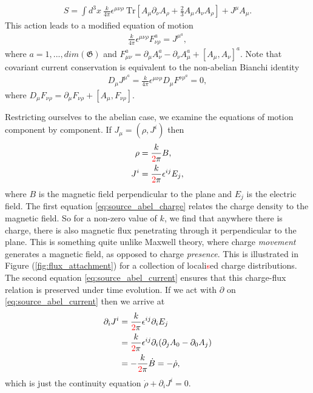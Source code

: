     \begin{align}
        S = \int d^3x \ \frac{k}{4 \pi} \epsilon^{\mu \nu \rho} \ \mathrm{Tr} \left[A_{\mu} \partial_{\nu} A_{\rho}+ \frac{2}{3} A_{\mu} A_{\nu} A_{\rho} \right] + J^{\mu} A_{\mu}.
    \end{align}
    This action leads to a modified equation of motion
    \begin{align}
        \frac{k}{4 \pi} \epsilon^{\mu \nu \rho} F^a_{\nu \rho} = J^{\mu}^a,
    \end{align}
    where $a=1,...,dim(\mathfrak{G})$ and $F_{\mu \nu}^a = \partial_{\mu} A_{\nu}^a - \partial_{\nu} A_{\mu}^a + [A_{\mu}, A_{\nu}]^a$. Note that covariant current conservation is equivalent to the non-abelian Bianchi identity
    \begin{align}
        D_{\mu} J^{\mu}^a = \frac{k}{4 \pi} \epsilon^{\mu \nu \rho} D_{\mu} F^{\nu \rho}^a = 0,
    \end{align}
    where $D_{\mu} F_{\nu \rho} = \partial_{\mu} F_{\nu \rho} + [A_{\mu}, F_{\nu \rho}]$.

    Restricting ourselves to the abelian case, we examine the equations of motion component by component. If $J_{\mu} = (\rho, J^i)$ then
    \begin{align}
        \rho  &= \frac{k}{\textcolor{red}{2} \pi} B \label{eq:source_abel_charge} ,\\
        J^i &= \frac{k}{\textcolor{red}{2} \pi} \epsilon^{i j } E_j \label{eq:source_abel_current},
    \end{align}
    where $B$ is the magnetic field perpendicular to the plane and $E_j$ is the electric field. The first equation \eqref{eq:source_abel_charge} relates the charge density to the magnetic field. So for a non-zero value of $k$, we find that anywhere there is charge, there is also magnetic flux penetrating through it perpendicular to the plane. This is something quite unlike Maxwell theory, where charge \textit{movement} generates a magnetic field, as opposed to charge \textit{presence}. This is illustrated in  Figure (\ref{fig:flux_attachment}) for a collection of locali\textcolor{red}{s}ed charge distributions. The second equation \eqref{eq:source_abel_current} ensures that this charge-flux relation is preserved under time evolution. If we act with $\partial$ on \eqref{eq:source_abel_current} then we arrive at
    \begin{align}
        \partial_i J^i &= \frac{k}{\textcolor{red}{2} \pi} \epsilon^{ij} \partial_i E_j\nonumber \\
        &= \frac{k}{\textcolor{red}{2} \pi} \epsilon^{ij} \partial_i ( \partial_j A_0 - \partial_0 A_j) \nonumber \\
        &= -\frac{k}{\textcolor{red}{2} \pi} \dot{B} = -\dot{\rho},
    \end{align}
    which is just the continuity equation $\dot{\rho} + \partial_i J^i=0$.





